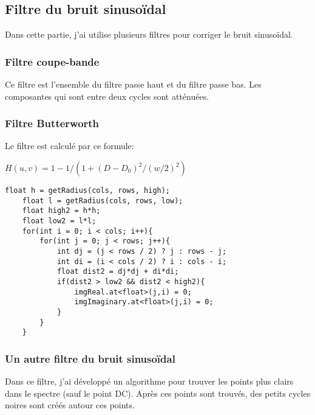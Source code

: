 \documentclass[paper=a4, fontsize=11pt]{scrartcl}	%
\begin{document}
\subsection{Filtre du bruit sinusoïdal}
Dans cette partie, j'ai utilise plusieurs filtres pour corriger le bruit sinusoïdal.
\subsubsection{Filtre coupe-bande}
Ce filtre est l'ensemble du filtre passe haut et du filtre passe bas. Les composantes qui sont entre deux cycles sont atténuées.
\subsubsection{Filtre Butterworth}
Le filtre est calculé par ce formule:
\begin{center}
	$H(u,v) = 1 - 1/(1 + (D-D_{0})^2/(w/2)^2)$

\end{center}
\begin{lstlisting}[label=butterworth,caption=Le filtre Butterworth]
    float h = getRadius(cols, rows, high);
    float l = getRadius(cols, rows, low);
    float high2 = h*h;
    float low2 = l*l;
    for(int i = 0; i < cols; i++){
        for(int j = 0; j < rows; j++){
            int dj = (j < rows / 2) ? j : rows - j;
            int di = (i < cols / 2) ? i : cols - i;
            float dist2 = dj*dj + di*di;
            if(dist2 > low2 && dist2 < high2){
                imgReal.at<float>(j,i) = 0;
                imgImaginary.at<float>(j,i) = 0;
            }
        }
    }
\end{lstlisting}
\subsubsection{Un autre filtre du bruit sinusoïdal}
Dans ce filtre, j'ai développé un algorithme pour trouver les points plus clairs dans le spectre (sauf le point DC). Après ces points sont trouvés, des petits cycles noires sont créés autour ces points.
\end{document}
